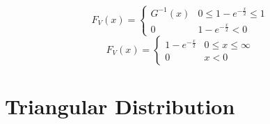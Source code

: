 \documentclass[journal,12pt,twocolumn]{IEEEtran}
\renewcommand\thesection{\arabic{section}}
\begin{document}
\begin{enumerate}[label=\thesection.\arabic*
,ref=\thesection.\theenumi]
\begin{equation}
F_V(x)=
\begin{cases}
G^{-1}(x) & 0 \le 1-e^{-\frac{x}{2}} \le 1 \\
0 &  1-e^{-\frac{x}{2}} < 0
\end{cases}
\end{equation}
\begin{equation}
F_V(x)=
\begin{cases}
1-e^{-\frac{x}{2}} & 0 \le x \le \infty \\
0 &  x < 0
\end{cases}
\end{equation}
%
\end{enumerate}
\section{Triangular Distribution}
\end{document}
